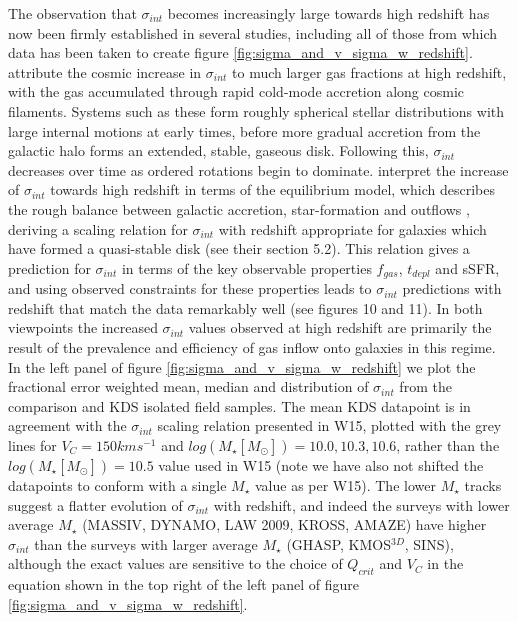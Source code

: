 \documentclass[fleqn,usenatbib]{mn2e}
\begin{document}
The observation that $\sigma_{int}$ becomes increasingly large towards high redshift has now been firmly established in several studies, including all of those from which data has been taken to create figure \ref{fig:sigma_and_v_sigma_w_redshift}.
\cite{Law2009} attribute the cosmic increase in $\sigma_{int}$ to much larger gas fractions at high redshift, with the gas accumulated through rapid cold-mode accretion along cosmic filaments.
Systems such as these form roughly spherical stellar distributions with large internal motions at early times, before more gradual accretion from the galactic halo forms an extended, stable, gaseous disk.
Following this, $\sigma_{int}$ decreases over time as ordered rotations begin to dominate.
\cite{Wisnioski2015} interpret the increase of $\sigma_{int}$ towards high redshift in terms of the equilibrium model, which describes the rough balance between galactic accretion, star-formation and outflows \citep[e.g.][]{Lilly2013}, deriving a scaling relation for $\sigma_{int}$ with redshift appropriate for galaxies which have formed a quasi-stable disk (see their section 5.2).
This relation gives a prediction for $\sigma_{int}$ in terms of the key observable properties $f_{gas}$, $t_{depl}$ and sSFR, and using observed constraints for these properties leads to $\sigma_{int}$ predictions with redshift that match the data remarkably well (see \cite{Wisnioski2015} figures 10 and 11).
In both viewpoints the increased $\sigma_{int}$ values observed at high redshift are primarily the result of the prevalence and efficiency of gas inflow onto galaxies in this regime. \\

In the left panel of figure \ref{fig:sigma_and_v_sigma_w_redshift} we plot the fractional error weighted mean, median and distribution of $\sigma_{int}$ from the comparison and KDS isolated field samples.
The mean KDS datapoint is in agreement with the $\sigma_{int}$ scaling relation presented in W15, plotted with the grey lines for $V_{C} = 150kms^{-1}$ and $log(M_{\star}[M_{\odot}])=10.0,10.3,10.6$, rather than the $log(M_{\star}[M_{\odot}])=10.5$ value used in W15 (note we have also not shifted the datapoints to conform with a single $M_{\star}$ value as per W15).
The lower $M_{\star}$ tracks suggest a flatter evolution of $\sigma_{int}$ with redshift, and indeed the surveys with lower average $M_{\star}$ (MASSIV, DYNAMO, LAW 2009, KROSS, AMAZE) have higher $\sigma_{int}$ than the surveys with larger average $M_{\star}$ (GHASP, KMOS$^{3D}$, SINS), although the exact values are sensitive to the choice of $Q_{crit}$ and $V_{C}$ in the equation shown in the top right of the left panel of figure \ref{fig:sigma_and_v_sigma_w_redshift}.
\end{document}
